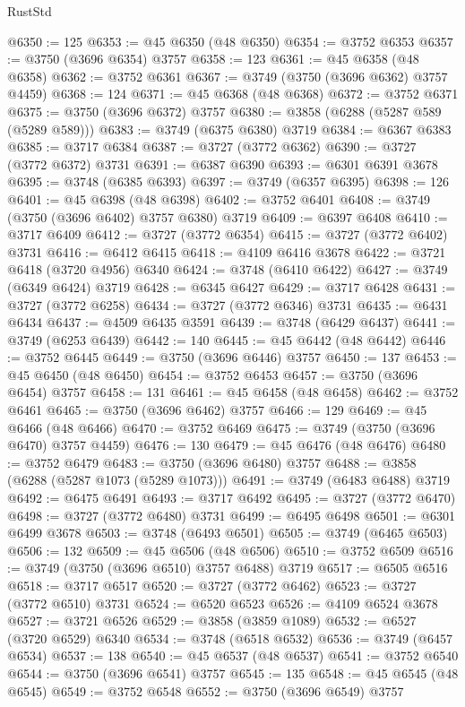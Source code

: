 \begin{lexlean}{RustStd}
\begin{coremodule}
@6350 := 125
@6353 := @45 @6350 (@48 @6350)
@6354 := @3752 @6353
@6357 := @3750 (@3696 @6354) @3757
@6358 := 123
@6361 := @45 @6358 (@48 @6358)
@6362 := @3752 @6361
@6367 := @3749 (@3750 (@3696 @6362) @3757 @4459)
@6368 := 124
@6371 := @45 @6368 (@48 @6368)
@6372 := @3752 @6371
@6375 := @3750 (@3696 @6372) @3757
@6380 := @3858 (@6288 (@5287 @589 (@5289 @589)))
@6383 := @3749 (@6375 @6380) @3719
@6384 := @6367 @6383
@6385 := @3717 @6384
@6387 := @3727 (@3772 @6362)
@6390 := @3727 (@3772 @6372) @3731
@6391 := @6387 @6390
@6393 := @6301 @6391 @3678
@6395 := @3748 (@6385 @6393)
@6397 := @3749 (@6357 @6395)
@6398 := 126
@6401 := @45 @6398 (@48 @6398)
@6402 := @3752 @6401
@6408 := @3749 (@3750 (@3696 @6402) @3757 @6380) @3719
@6409 := @6397 @6408
@6410 := @3717 @6409
@6412 := @3727 (@3772 @6354)
@6415 := @3727 (@3772 @6402) @3731
@6416 := @6412 @6415
@6418 := @4109 @6416 @3678
@6422 := @3721 @6418 (@3720 @4956) @6340
@6424 := @3748 (@6410 @6422)
@6427 := @3749 (@6349 @6424) @3719
@6428 := @6345 @6427
@6429 := @3717 @6428
@6431 := @3727 (@3772 @6258)
@6434 := @3727 (@3772 @6346) @3731
@6435 := @6431 @6434
@6437 := @4509 @6435 @3591
@6439 := @3748 (@6429 @6437)
@6441 := @3749 (@6253 @6439)
@6442 := 140
@6445 := @45 @6442 (@48 @6442)
@6446 := @3752 @6445
@6449 := @3750 (@3696 @6446) @3757
@6450 := 137
@6453 := @45 @6450 (@48 @6450)
@6454 := @3752 @6453
@6457 := @3750 (@3696 @6454) @3757
@6458 := 131
@6461 := @45 @6458 (@48 @6458)
@6462 := @3752 @6461
@6465 := @3750 (@3696 @6462) @3757
@6466 := 129
@6469 := @45 @6466 (@48 @6466)
@6470 := @3752 @6469
@6475 := @3749 (@3750 (@3696 @6470) @3757 @4459)
@6476 := 130
@6479 := @45 @6476 (@48 @6476)
@6480 := @3752 @6479
@6483 := @3750 (@3696 @6480) @3757
@6488 := @3858 (@6288 (@5287 @1073 (@5289 @1073)))
@6491 := @3749 (@6483 @6488) @3719
@6492 := @6475 @6491
@6493 := @3717 @6492
@6495 := @3727 (@3772 @6470)
@6498 := @3727 (@3772 @6480) @3731
@6499 := @6495 @6498
@6501 := @6301 @6499 @3678
@6503 := @3748 (@6493 @6501)
@6505 := @3749 (@6465 @6503)
@6506 := 132
@6509 := @45 @6506 (@48 @6506)
@6510 := @3752 @6509
@6516 := @3749 (@3750 (@3696 @6510) @3757 @6488) @3719
@6517 := @6505 @6516
@6518 := @3717 @6517
@6520 := @3727 (@3772 @6462)
@6523 := @3727 (@3772 @6510) @3731
@6524 := @6520 @6523
@6526 := @4109 @6524 @3678
@6527 := @3721 @6526
@6529 := @3858 (@3859 @1089)
@6532 := @6527 (@3720 @6529) @6340
@6534 := @3748 (@6518 @6532)
@6536 := @3749 (@6457 @6534)
@6537 := 138
@6540 := @45 @6537 (@48 @6537)
@6541 := @3752 @6540
@6544 := @3750 (@3696 @6541) @3757
@6545 := 135
@6548 := @45 @6545 (@48 @6545)
@6549 := @3752 @6548
@6552 := @3750 (@3696 @6549) @3757

\end{coremodule}
\end{lexlean}
